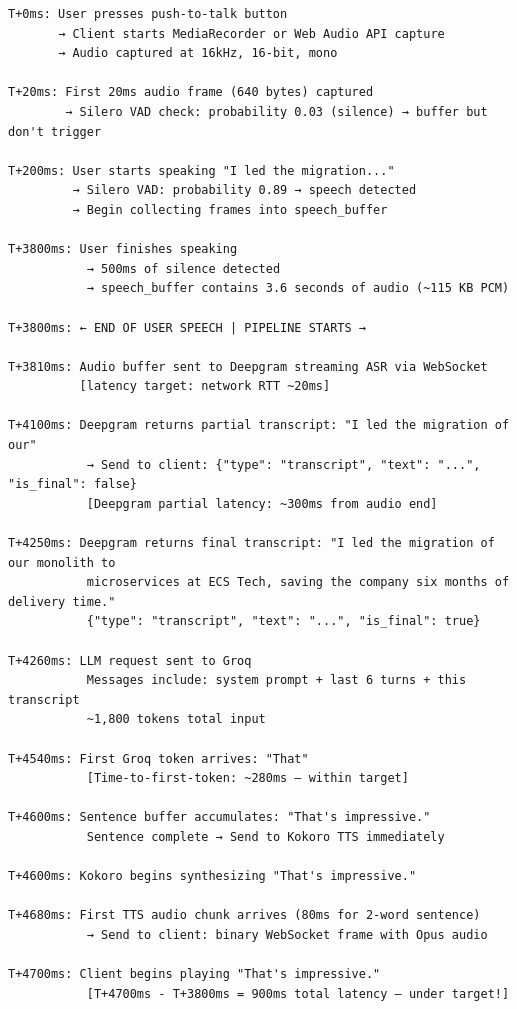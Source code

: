 \documentclass[
  11pt,
]{article}
\begin{document}
\begin{lstlisting}
T+0ms: User presses push-to-talk button
       → Client starts MediaRecorder or Web Audio API capture
       → Audio captured at 16kHz, 16-bit, mono

T+20ms: First 20ms audio frame (640 bytes) captured
        → Silero VAD check: probability 0.03 (silence) → buffer but don't trigger
        
T+200ms: User starts speaking "I led the migration..."
         → Silero VAD: probability 0.89 → speech detected
         → Begin collecting frames into speech_buffer
         
T+3800ms: User finishes speaking
           → 500ms of silence detected
           → speech_buffer contains 3.6 seconds of audio (~115 KB PCM)

T+3800ms: ← END OF USER SPEECH | PIPELINE STARTS →

T+3810ms: Audio buffer sent to Deepgram streaming ASR via WebSocket
          [latency target: network RTT ~20ms]

T+4100ms: Deepgram returns partial transcript: "I led the migration of our"
           → Send to client: {"type": "transcript", "text": "...", "is_final": false}
           [Deepgram partial latency: ~300ms from audio end]

T+4250ms: Deepgram returns final transcript: "I led the migration of our monolith to 
           microservices at ECS Tech, saving the company six months of delivery time."
           {"type": "transcript", "text": "...", "is_final": true}
           
T+4260ms: LLM request sent to Groq
           Messages include: system prompt + last 6 turns + this transcript
           ~1,800 tokens total input
           
T+4540ms: First Groq token arrives: "That"
           [Time-to-first-token: ~280ms — within target]
           
T+4600ms: Sentence buffer accumulates: "That's impressive."
           Sentence complete → Send to Kokoro TTS immediately
           
T+4600ms: Kokoro begins synthesizing "That's impressive."
           
T+4680ms: First TTS audio chunk arrives (80ms for 2-word sentence)
           → Send to client: binary WebSocket frame with Opus audio
           
T+4700ms: Client begins playing "That's impressive."
           [T+4700ms - T+3800ms = 900ms total latency — under target!]


\end{lstlisting}
\end{document}
